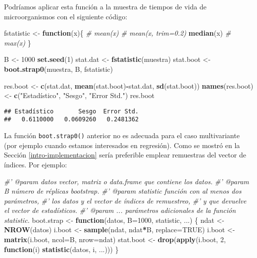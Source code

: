 \documentclass[]{book}
\newenvironment{Shaded}{\begin{snugshade}}{\end{snugshade}}
\newcommand{\KeywordTok}[1]{\textcolor[rgb]{0.13,0.29,0.53}{\textbf{#1}}}
\newcommand{\DataTypeTok}[1]{\textcolor[rgb]{0.13,0.29,0.53}{#1}}
\newcommand{\DecValTok}[1]{\textcolor[rgb]{0.00,0.00,0.81}{#1}}
\newcommand{\StringTok}[1]{\textcolor[rgb]{0.31,0.60,0.02}{#1}}
\newcommand{\CommentTok}[1]{\textcolor[rgb]{0.56,0.35,0.01}{\textit{#1}}}
\newcommand{\OtherTok}[1]{\textcolor[rgb]{0.56,0.35,0.01}{#1}}
\newcommand{\ControlFlowTok}[1]{\textcolor[rgb]{0.13,0.29,0.53}{\textbf{#1}}}
\newcommand{\OperatorTok}[1]{\textcolor[rgb]{0.81,0.36,0.00}{\textbf{#1}}}
\newcommand{\NormalTok}[1]{#1}
\theoremstyle{break}
\theoremstyle{definition}
\theoremstyle{definition}
\theoremstyle{definition}
\theoremstyle{remark}
\begin{document}
Podríamos aplicar esta función a la muestra de tiempos de vida de
microorganismos con el siguiente código:

\begin{Shaded}
\begin{Highlighting}[]
\NormalTok{fstatistic <-}\StringTok{ }\ControlFlowTok{function}\NormalTok{(x)\{}
  \CommentTok{#  mean(x)}
  \CommentTok{#  mean(x, trim=0.2)}
  \KeywordTok{median}\NormalTok{(x)}
  \CommentTok{#  max(x)}
\NormalTok{\}}

\NormalTok{B <-}\StringTok{ }\DecValTok{1000}
\KeywordTok{set.seed}\NormalTok{(}\DecValTok{1}\NormalTok{)}
\NormalTok{stat.dat <-}\StringTok{ }\KeywordTok{fstatistic}\NormalTok{(muestra)}
\NormalTok{stat.boot <-}\StringTok{ }\KeywordTok{boot.strap0}\NormalTok{(muestra, B, fstatistic)}

\NormalTok{res.boot <-}\StringTok{ }\KeywordTok{c}\NormalTok{(stat.dat, }\KeywordTok{mean}\NormalTok{(stat.boot)}\OperatorTok{-}\NormalTok{stat.dat, }\KeywordTok{sd}\NormalTok{(stat.boot))}
\KeywordTok{names}\NormalTok{(res.boot) <-}\StringTok{ }\KeywordTok{c}\NormalTok{(}\StringTok{"Estadístico"}\NormalTok{, }\StringTok{"Sesgo"}\NormalTok{, }\StringTok{"Error Std."}\NormalTok{)}
\NormalTok{res.boot}
\end{Highlighting}
\end{Shaded}

\begin{verbatim}
## Estadístico       Sesgo  Error Std. 
##   0.6110000   0.0609260   0.2481362
\end{verbatim}

La función \texttt{boot.strap0()} anterior no es adecuada para el caso
multivariante (por ejemplo cuando estamos interesados en regresión).
Como se mostró en la Sección \ref{intro-implementacion} sería preferible
emplear remuestras del vector de índices. Por ejemplo:

\begin{Shaded}
\begin{Highlighting}[]
\CommentTok{#' @param datos vector, matriz o data.frame que contiene los datos.}
\CommentTok{#' @param B número de réplicas bootstrap.}
\CommentTok{#' @param statistic función con al menos dos parámetros, }
\CommentTok{#' los datos y el vector de índices de remuestreo, }
\CommentTok{#' y que devuelve el vector de estadísticos.}
\CommentTok{#' @param ... parámetros adicionales de la función statistic.}
\NormalTok{boot.strap <-}\StringTok{ }\ControlFlowTok{function}\NormalTok{(datos, }\DataTypeTok{B=}\DecValTok{1000}\NormalTok{, statistic, ...) \{}
\NormalTok{  ndat <-}\StringTok{ }\KeywordTok{NROW}\NormalTok{(datos)}
\NormalTok{  i.boot <-}\StringTok{ }\KeywordTok{sample}\NormalTok{(ndat, ndat}\OperatorTok{*}\NormalTok{B, }\DataTypeTok{replace=}\OtherTok{TRUE}\NormalTok{)}
\NormalTok{  i.boot <-}\StringTok{ }\KeywordTok{matrix}\NormalTok{(i.boot, }\DataTypeTok{ncol=}\NormalTok{B, }\DataTypeTok{nrow=}\NormalTok{ndat)}
\NormalTok{  stat.boot <-}\StringTok{ }\KeywordTok{drop}\NormalTok{(}\KeywordTok{apply}\NormalTok{(i.boot, }\DecValTok{2}\NormalTok{, }\ControlFlowTok{function}\NormalTok{(i) }\KeywordTok{statistic}\NormalTok{(datos, i, ...)))}
\NormalTok{\}}
\end{Highlighting}
\end{Shaded}
\end{document}
